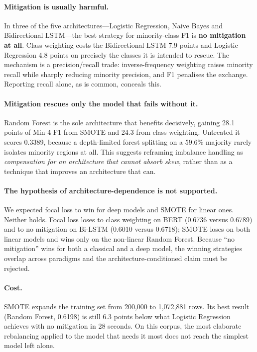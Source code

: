 \documentclass[11pt]{article}
\begin{document}
\paragraph{Mitigation is usually harmful.}
In three of the five architectures---Logistic Regression, Naive Bayes and
Bidirectional LSTM---the best strategy for minority-class F1 is \textbf{no
mitigation at all}. Class weighting costs the Bidirectional LSTM 7.9 points and
Logistic Regression 4.8 points on precisely the classes it is intended to
rescue. The mechanism is a precision/recall trade: inverse-frequency weighting
raises minority recall while sharply reducing minority precision, and F1
penalises the exchange. Reporting recall alone, as is common, conceals this.

\paragraph{Mitigation rescues only the model that fails without it.}
Random Forest is the sole architecture that benefits decisively, gaining 28.1
points of Min-4 F1 from SMOTE and 24.3 from class weighting. Untreated it scores
0.3389, because a depth-limited forest splitting on a 59.6\% majority rarely
isolates minority regions at all. This suggests reframing imbalance handling as
\emph{compensation for an architecture that cannot absorb skew}, rather than as
a technique that improves an architecture that can.

\paragraph{The hypothesis of architecture-dependence is not supported.}
We expected focal loss to win for deep models and SMOTE for linear ones. Neither
holds. Focal loss loses to class weighting on BERT (0.6736 versus 0.6789) and to
no mitigation on Bi-LSTM (0.6010 versus 0.6718); SMOTE loses on both linear
models and wins only on the non-linear Random Forest. Because ``no mitigation''
wins for both a classical and a deep model, the winning strategies overlap
across paradigms and the architecture-conditioned claim must be rejected.

\paragraph{Cost.}
SMOTE expands the training set from 200{,}000 to 1{,}072{,}881 rows. Its best
result (Random Forest, 0.6198) is still 6.3 points below what Logistic
Regression achieves with no mitigation in 28 seconds. On this corpus, the most
elaborate rebalancing applied to the model that needs it most does not reach the
simplest model left alone.
\end{document}
